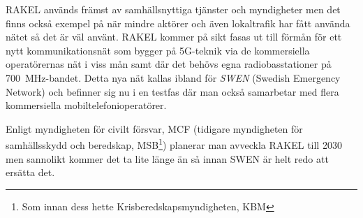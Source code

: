 RAKEL används främst av samhällsnyttiga tjänster och myndigheter men det
finns också exempel på när mindre aktörer och även lokaltrafik har fått
använda nätet så det är väl använt. RAKEL kommer på sikt fasas ut till förmån
för ett nytt kommunikationsnät som bygger på 5G-teknik via de kommersiella
operatörernas nät i viss mån samt där det behövs egna radiobasstationer på
700~MHz-bandet. Detta nya nät kallas ibland för {\it SWEN} (Swedish Emergency
Network) och befinner sig nu i en testfas där man också samarbetar med flera
kommersiella mobiltelefonioperatörer.

Enligt myndigheten för civilt försvar, MCF (tidigare myndigheten för samhällsskydd
och beredskap, MSB\footnote{Som innan dess hette Krisberedskapsmyndigheten, KBM})
planerar man avveckla RAKEL till 2030 men sannolikt kommer det ta lite länge än
så innan SWEN är helt redo att ersätta det.

